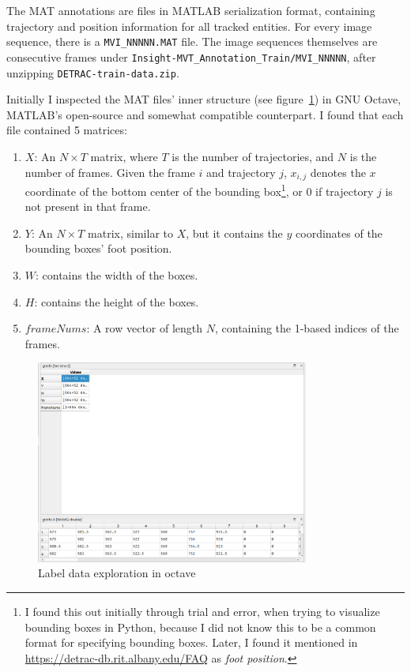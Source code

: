 The MAT annotations are files in MATLAB serialization format, containing trajectory and position information for all tracked entities. For every image sequence, there is a \verb|MVI_NNNNN.MAT| file.
The image sequences themselves are consecutive frames under \verb|Insight-MVT_Annotation_Train/MVI_NNNNN|, after unzipping \verb|DETRAC-train-data.zip|.

Initially I inspected the MAT files' inner structure (see figure~\ref{fig:octave-exploration}) in GNU Octave, MATLAB's open-source and somewhat compatible counterpart. I found that each file contained 5 matrices:
\begin{enumerate}
    \item{$X$: An $N \times T$ matrix, where $T$ is the number of trajectories, and $N$ is the number of frames. Given the frame $i$ and trajectory $j$, $x_{i,j}$ denotes the $x$ coordinate of the bottom center of the bounding box\footnote{I found this out initially through trial and error, when trying to visualize bounding boxes in Python, because I did not know this to be a common format for specifying bounding boxes. Later, I found it mentioned in \url{https://detrac-db.rit.albany.edu/FAQ} as \textit{foot position}.}, or $0$ if trajectory $j$ is not present in that frame.}
    \item{$Y$: An $N \times T$ matrix, similar to $X$, but it contains the $y$ coordinates of the bounding boxes' foot position.}
    \item{$W$: contains the width of the boxes.}
    \item{$H$: contains the height of the boxes.}
    \item{$frameNums$: A row vector of length $N$, containing the 1-based indices of the frames.}
\end{enumerate}

\begin{figure}[h]
    \begin{center}
        \captionsetup{width=0.8\textwidth}
        \includegraphics[width=0.8\textwidth]{figures/octave.png}
        \caption{Label data exploration in octave}
        \label{fig:octave-exploration}
    \end{center}
\end{figure}

